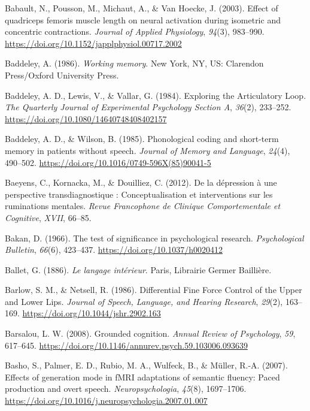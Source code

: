 \documentclass[a4paper,12pt,twoside,openright,oldfontcommands]{memoir}
\begin{document}
\leavevmode\hypertarget{ref-babault_effect_2003}{}%
Babault, N., Pousson, M., Michaut, A., \& Van Hoecke, J. (2003). Effect of quadriceps femoris muscle length on neural activation during isometric and concentric contractions. \emph{Journal of Applied Physiology}, \emph{94}(3), 983--990. \url{https://doi.org/10.1152/japplphysiol.00717.2002}

\leavevmode\hypertarget{ref-baddeley_working_1986}{}%
Baddeley, A. (1986). \emph{Working memory}. New York, NY, US: Clarendon Press/Oxford University Press.

\leavevmode\hypertarget{ref-baddeley_exploring_1984}{}%
Baddeley, A. D., Lewis, V., \& Vallar, G. (1984). Exploring the Articulatory Loop. \emph{The Quarterly Journal of Experimental Psychology Section A}, \emph{36}(2), 233--252. \url{https://doi.org/10.1080/14640748408402157}

\leavevmode\hypertarget{ref-baddeley_phonological_1985}{}%
Baddeley, A. D., \& Wilson, B. (1985). Phonological coding and short-term memory in patients without speech. \emph{Journal of Memory and Language}, \emph{24}(4), 490--502. \url{https://doi.org/10.1016/0749-596X(85)90041-5}

\leavevmode\hypertarget{ref-Baeyens2012}{}%
Baeyens, C., Kornacka, M., \& Douilliez, C. (2012). De la dépression à une perspective transdiagnostique : Conceptualisation et interventions sur les ruminations mentales. \emph{Revue Francophone de Clinique Comportementale et Cognitive}, \emph{XVII}, 66--85.

\leavevmode\hypertarget{ref-bakan_test_1966}{}%
Bakan, D. (1966). The test of significance in psychological research. \emph{Psychological Bulletin}, \emph{66}(6), 423--437. \url{https://doi.org/10.1037/h0020412}

\leavevmode\hypertarget{ref-ballet_langage_1886}{}%
Ballet, G. (1886). \emph{Le langage intérieur}. Paris, Librairie Germer Baillière.

\leavevmode\hypertarget{ref-barlow_differential_1986}{}%
Barlow, S. M., \& Netsell, R. (1986). Differential Fine Force Control of the Upper and Lower Lips. \emph{Journal of Speech, Language, and Hearing Research}, \emph{29}(2), 163--169. \url{https://doi.org/10.1044/jshr.2902.163}

\leavevmode\hypertarget{ref-Barsalou2008}{}%
Barsalou, L. W. (2008). Grounded cognition. \emph{Annual Review of Psychology}, \emph{59}, 617--645. \url{https://doi.org/10.1146/annurev.psych.59.103006.093639}

\leavevmode\hypertarget{ref-basho_effects_2007}{}%
Basho, S., Palmer, E. D., Rubio, M. A., Wulfeck, B., \& Müller, R.-A. (2007). Effects of generation mode in fMRI adaptations of semantic fluency: Paced production and overt speech. \emph{Neuropsychologia}, \emph{45}(8), 1697--1706. \url{https://doi.org/10.1016/j.neuropsychologia.2007.01.007}
\end{document}
